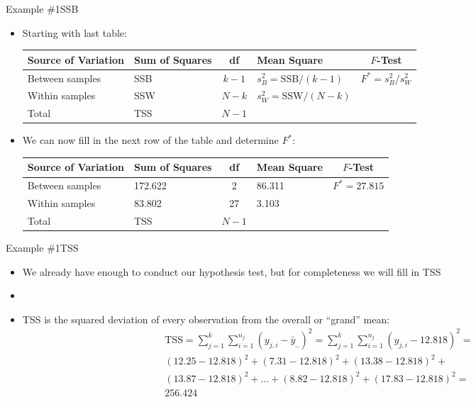 \documentclass[xcolor=dvipsnames]{beamer}
\begin{document}
\begin{frame}{Example \#1}{SSB}
	\begin{itemize}
		\item Starting with last table:
		\vspace{2mm}
		\begin{center}
			{\scriptsize
				\begin{tabular}{lp{1.2cm}cp{2.5cm}c}
					\hline 
					\textbf{Source of Variation} & \textbf{Sum of Squares} & \textbf{df} & \textbf{Mean Square} & $F$-\textbf{Test} \\ \hline 
					Between samples & SSB & $k - 1$ & $s_B^2 = \text{SSB} / (k-1)$ & $F^* = s_B^2 / s_W^2$ \\
					Within samples & SSW & $N - k$ &  $s_W^2 = \text{SSW} / (N-k)$ & \\
					Total & TSS & $N-1$ & & \\ \hline
			\end{tabular}}
		\end{center}
		\vspace{5mm}
		\item We can now fill in the next row of the table and determine $F^*$:
		\vspace{2mm}
		\begin{center}
			{\scriptsize
				\begin{tabular}{lp{1.2cm}cp{2.5cm}c}
					\hline 
					\textbf{Source of Variation} & \textbf{Sum of Squares} & \textbf{df} & \textbf{Mean Square} & $F$-\textbf{Test} \\ \hline 
					Between samples & 172.622 & 2 & 86.311 & $F^*=27.815$ \\
					Within samples & 83.802 & 27 &  3.103 & \\
					Total & TSS & $N-1$ & & \\ \hline
			\end{tabular}}
		\end{center}
	\end{itemize}
\end{frame}

\begin{frame}{Example \#1}{TSS}
	\begin{itemize}
		\item We already have enough to conduct our hypothesis test, but for completeness we will fill in TSS
		\item[]
		\item TSS is the squared deviation of every observation from the overall or ``grand'' mean:
		\begin{gather*}
		\text{TSS} = \sum_{j=1}^{k} \sum_{i = 1}^{n_j}\left(y_{j,i} - \bar{y}_{..}\right)^2 = \sum_{j=1}^{k} \sum_{i = 1}^{n_j}\left(y_{j,i} - 12.818\right)^2 = \\
		(12.25 - 12.818)^2 + (7.31 - 12.818)^2 + (13.38 - 12.818)^2 + \\(13.87 - 12.818)^2 + \hdots + (8.82 - 12.818)^2 + (17.83 - 12.818)^2 =\\
		256.424
		\end{gather*}
	\end{itemize}
\end{frame}
\end{document}
